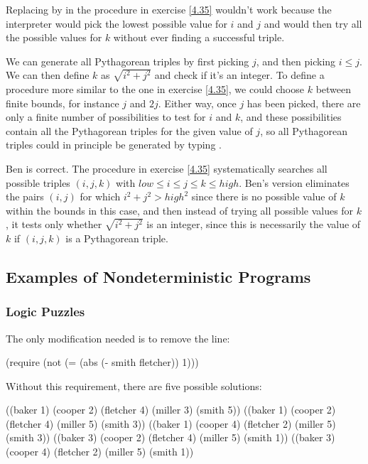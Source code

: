 \begin{exe}[4.36]
    Replacing  by  in 
    the procedure in exercise \ref{4.35} wouldn’t work because the interpreter 
    would pick the lowest possible value for $i$ and $j$ and would then try all 
    the possible values for $k$ without ever finding a successful triple.

    We can generate all Pythagorean triples by first picking $j$, and then 
    picking $i \leq j$. We can then define $k$ as $\sqrt{i^2 + j^2}$ and check 
    if it’s an integer. To define a procedure more similar to the one in 
    exercise \ref{4.35}, we could choose $k$ between finite bounds, for instance 
    $j$ and $2j$. Either way, once $j$ has been picked, there are only a finite 
    number of possibilities to test for $i$ and $k$, and these possibilities 
    contain all the Pythagorean triples for the given value of $j$, so all 
    Pythagorean triples could in principle be generated by typing 
    .
\end{exe}

\begin{exe}[4.37]
    Ben is correct. The procedure in exercise \ref{4.35} systematically searches 
    all possible triples $(i, j, k)$ with $low \leq i \leq j \leq k \leq high$. 
    Ben’s version eliminates the pairs $(i, j)$ for which $i^2 + j^2 > high^2$ 
    since there is no possible value of $k$ within the bounds in this case, and 
    then instead of trying all possible values for $k$, it tests only whether 
    $\sqrt{i^2 + j^2}$ is an integer, since this is necessarily the value of $k$ 
    if $(i, j, k)$ is a Pythagorean triple.
\end{exe}

\subsection{Examples of Nondeterministic Programs}

\subsubsection{Logic Puzzles}

\begin{exe}[4.38]
    The only modification needed is to remove the line:
    \begin{cscm}
        (require (not (= (abs (- smith fletcher)) 1)))
    \end{cscm}
    Without this requirement, there are five possible solutions:
    \begin{cscm}
        ((baker 1) (cooper 2) (fletcher 4) (miller 3) (smith 5))
        ((baker 1) (cooper 2) (fletcher 4) (miller 5) (smith 3))
        ((baker 1) (cooper 4) (fletcher 2) (miller 5) (smith 3))
        ((baker 3) (cooper 2) (fletcher 4) (miller 5) (smith 1))
        ((baker 3) (cooper 4) (fletcher 2) (miller 5) (smith 1))
    \end{cscm}
\end{exe}

